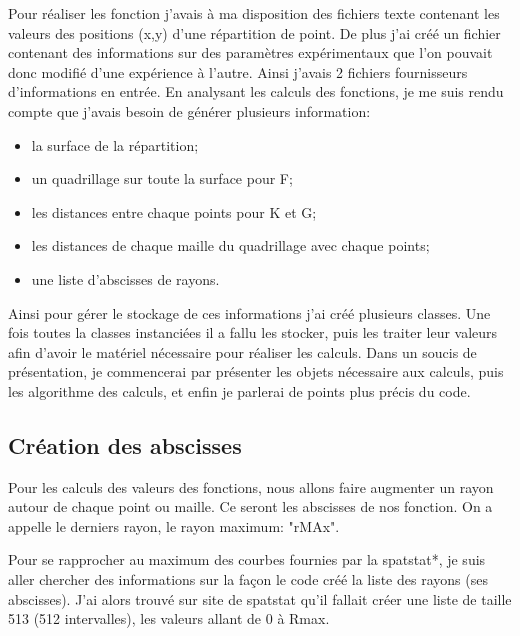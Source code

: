 \documentclass[stage2a]{tnreport}
\begin{document}
Pour réaliser les fonction j'avais à ma disposition des fichiers texte contenant les valeurs des positions (x,y) d'une répartition de point. De plus j'ai créé un fichier contenant des informations sur des paramètres expérimentaux que l'on pouvait donc modifié d'une expérience à l'autre. Ainsi j'avais 2 fichiers fournisseurs d'informations en entrée.
En analysant les calculs des fonctions, je me suis rendu compte que j'avais besoin de générer plusieurs information:
\begin{itemize}
\item la surface de la répartition;
\item un quadrillage sur toute la surface pour F;
\item les distances entre chaque points pour K et G;
\item les distances de chaque maille du quadrillage avec chaque points;
\item une liste d'abscisses de rayons.\\
\end{itemize}
Ainsi pour gérer le stockage de ces informations j'ai créé plusieurs classes. Une fois toutes la classes instanciées il a fallu les stocker, puis les traiter leur valeurs afin d'avoir le matériel nécessaire pour réaliser les calculs. Dans un soucis de présentation, je commencerai par présenter les objets nécessaire aux calculs, puis les algorithme des calculs, et enfin je parlerai de points plus précis du code. 

\subsection{Création des abscisses}

Pour les calculs des valeurs des fonctions, nous allons faire augmenter un rayon autour de chaque point ou maille. Ce seront les abscisses de nos fonction. On a appelle le derniers rayon, le rayon maximum: "rMAx".

Pour se rapprocher au maximum des courbes fournies par la \gls{spatstat}*, je suis aller chercher des informations sur la façon le code créé la liste des rayons (ses abscisses). J'ai alors trouvé sur site de spatstat\cite{FAQspatstat} qu'il fallait créer une liste de taille 513 (512 intervalles), les valeurs allant de 0 à Rmax.
\end{document}
